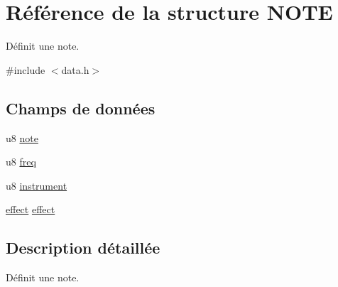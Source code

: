 \hypertarget{struct_n_o_t_e}{
\section{Référence de la structure NOTE}
\label{struct_n_o_t_e}
}


Définit une note.  




{\ttfamily \#include $<$data.h$>$}

\subsection*{Champs de données}
\begin{DoxyCompactItemize}
\item 
u8 \hyperlink{struct_n_o_t_e_ae312e84740a2f94fd423ce02bac7c81d}{note}
\item 
u8 \hyperlink{struct_n_o_t_e_aadfadeeef2295627c3f6e78dfd46cf73}{freq}
\item 
u8 \hyperlink{struct_n_o_t_e_a1c6a03f41107c548d1ecb7435d3541e0}{instrument}
\item 
\hyperlink{struct_e_f_f_e_c_t}{effect} \hyperlink{struct_n_o_t_e_a741151ee9cb5c0bde79f6dfee55f951a}{effect}
\end{DoxyCompactItemize}


\subsection{Description détaillée}
Définit une note. 

